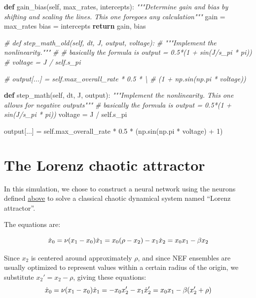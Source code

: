 \documentclass{report}
\newenvironment{Shaded}{}{}
\newcommand{\KeywordTok}[1]{\textcolor[rgb]{0.00,0.44,0.13}{\textbf{{#1}}}}
\newcommand{\DecValTok}[1]{\textcolor[rgb]{0.25,0.63,0.44}{{#1}}}
\newcommand{\FloatTok}[1]{\textcolor[rgb]{0.25,0.63,0.44}{{#1}}}
\newcommand{\CommentTok}[1]{\textcolor[rgb]{0.38,0.63,0.69}{\textit{{#1}}}}
\newcommand{\NormalTok}[1]{{#1}}
\newcommand{\VariableTok}[1]{\textcolor[rgb]{0.10,0.09,0.49}{{#1}}}
\newcommand{\ControlFlowTok}[1]{\textcolor[rgb]{0.00,0.44,0.13}{\textbf{{#1}}}}
\newcommand{\OperatorTok}[1]{\textcolor[rgb]{0.40,0.40,0.40}{{#1}}}
\begin{document}
\begin{Shaded}
\begin{Highlighting}[]
    \KeywordTok{def}\NormalTok{ gain_bias(}\VariableTok{self}\NormalTok{, max_rates, intercepts):}
        \CommentTok{"""Determine gain and bias by shifting and scaling the lines.}
\CommentTok{        This one foregoes any calculation"""}
\NormalTok{        gain }\OperatorTok{=}\NormalTok{ max_rates}
\NormalTok{        bias }\OperatorTok{=}\NormalTok{ intercepts}
        \ControlFlowTok{return}\NormalTok{ gain, bias}

    \CommentTok{# def step_math_old(self, dt, J, output, voltage):}
    \CommentTok{#     """Implement the nonlinearity."""}
    \CommentTok{#     # basically the formula is output = 0.5*(1 + sin(J/s_pi * pi))}
    \CommentTok{#     voltage = J / self.s_pi}

    \CommentTok{#     output[...] = self.max_overall_rate * 0.5 * \textbackslash{}}
    \CommentTok{#         (1 + np.sin(np.pi * voltage))}

    \KeywordTok{def}\NormalTok{ step_math(}\VariableTok{self}\NormalTok{, dt, J, output):}
        \CommentTok{"""Implement the nonlinearity.}
\CommentTok{        This one allows for negative outputs"""}
        \CommentTok{# basically the formula is output = 0.5*(1 + sin(J/s_pi * pi))}
\NormalTok{        voltage }\OperatorTok{=}\NormalTok{ J }\OperatorTok{/} \VariableTok{self}\NormalTok{.s_pi}

\NormalTok{        output[...] }\OperatorTok{=} \VariableTok{self}\NormalTok{.max_overall_rate }\OperatorTok{*} \FloatTok{0.5} \OperatorTok{*}\NormalTok{ (np.sin(np.pi }\OperatorTok{*}\NormalTok{ voltage) }\OperatorTok{+} \DecValTok{1}\NormalTok{)}
\end{Highlighting}
\end{Shaded}

\section{The Lorenz chaotic
attractor}\label{the-lorenz-chaotic-attractor}

In this simulation, we chose to construct a neural network using the
neurons defined \protect\hyperlink{fourier_neuron_nengo}{above} to solve
a classical chaotic dynamical system named ``Lorenz attractor''.

The equations are:

\[
\dot{x}_0 = \nu(x_1 - x_0) \\
\dot{x}_1 = x_0 (\rho - x_2) - x_1  \\
\dot{x}_2 = x_0 x_1 - \beta x_2 
\]

Since \(x_2\) is centered around approximately \(\rho\), and since NEF
ensembles are usually optimized to represent values within a certain
radius of the origin, we substitute \(x_2' = x_2 - \rho\), giving these
equations: \[
\dot{x}_0 = \nu(x_1 - x_0) \\
\dot{x}_1 = - x_0 x_2' - x_1\\
\dot{x}_2' = x_0 x_1 - \beta (x_2' + \rho)
\]
\end{document}

